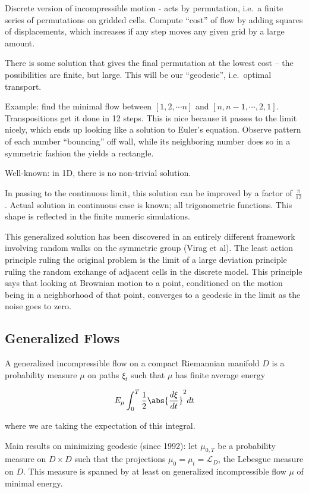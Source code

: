Discrete version of incompressible motion - acts by permutation, i.e.~a
finite series of permutations on gridded cells. Compute ``cost'' of flow
by adding squares of displacements, which increases if any step moves
any given grid by a large amount.

There is some solution that gives the final permutation at the lowest
cost -- the possibilities are finite, but large. This will be our
``geodesic'', i.e.~optimal transport.

Example: find the minimal flow between \([1,2,\cdots n]\) and
\([n, n-1, \cdots, 2, 1]\). Transpositions get it done in 12 steps. This
is nice because it passes to the limit nicely, which ends up looking
like a solution to Euler's equation. Observe pattern of each number
``bouncing'' off wall, while its neighboring number does so in a
symmetric fashion the yields a rectangle.

Well-known: in 1D, there is no non-trivial solution.

In passing to the continuous limit, this solution can be improved by a
factor of \(\frac \pi {12}\). Actual solution in continuous case is
known; all trigonometric functions. This shape is reflected in the
finite numeric simulations.

This generalized solution has been discovered in an entirely different
framework involving random walks on the symmetric group (Virag et al).
The least action principle ruling the original problem is the limit of a
large deviation principle ruling the random exchange of adjacent cells
in the discrete model. This principle says that looking at Brownian
motion to a point, conditioned on the motion being in a neighborhood of
that point, converges to a geodesic in the limit as the noise goes to
zero.

\hypertarget{generalized-flows}{%
\subsection{Generalized Flows}\label{generalized-flows}}

A generalized incompressible flow on a compact Riemannian manifold \(D\)
is a probability measure \(\mu\) on paths \(\xi_t\) such that \(\mu\)
has finite average energy

\[
E_\mu \int_0^T \frac 1 2 \abs{\frac{d\xi}{dt}}^2 dt
\]

where we are taking the expectation of this integral.

Main results on minimizing geodesic (since 1992): let \(\mu_{0, T}\) be
a probability measure on \(D \times D\) such that the projections
\(\mu_0=\mu_t = \mathcal{L}_D\), the Lebesgue measure on \(D\). This
measure is spanned by at least on generalized incompressible flow
\(\mu\) of minimal energy.

